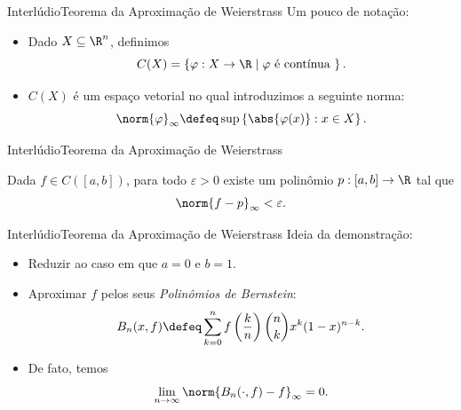 \documentclass[13pt]{beamer}
\begin{document}
\begin{frame}{Interlúdio}{Teorema da Aproximação de Weierstrass}
    Um pouco de notação:
    \begin{itemize}
        \item Dado \( X \subseteq \R^{ n } \), definimos
            \begin{equation*}
                C ( X ) = \left\{ \varphi : X \to \R \mid \varphi \text{ é contínua } \right\}
            .\end{equation*}
        \item \( C ( X ) \) é um espaço vetorial no qual introduzimos a seguinte norma:
            \begin{equation*}
                \norm{ \varphi }_{ \infty } \defeq \sup \left\{ \abs{ \varphi ( x ) } : x \in X \right\}
            .\end{equation*}
    \end{itemize}
\end{frame}

\begin{frame}{Interlúdio}{Teorema da Aproximação de Weierstrass}
    \begin{teo*}
        Dada \( f \in C ( [a, b] ) \), para todo \( \varepsilon > 0 \) existe um polinômio \( p : [a, b] \to \R \) tal que
        \begin{equation*}
            \norm{ f - p }_{ \infty } < \varepsilon
        .\end{equation*}
    \end{teo*}
\end{frame}

\begin{frame}{Interlúdio}{Teorema da Aproximação de Weierstrass}
    Ideia da demonstração:
    \begin{itemize}
        \item<1-> Reduzir ao caso em que \( a = 0 \) e \( b = 1 \).
        \item<2-> Aproximar \( f \) pelos seus \emph{Polinômios de Bernstein}:
            \begin{equation*}
                B_{ n } ( x, f ) \defeq \sum_{ k=0 }^{ n } f
                \left( \frac{ k }{ n } \right)
                \binom{n}{k}
                x^{ k }
                ( 1 - x )^{ n - k }
            .\end{equation*}
        \item<3-> De fato, temos
            \begin{equation*}
                \lim_{ n \to \infty } \norm{ B_{ n } ( \cdot, f ) - f }_{ \infty } = 0
            .\end{equation*}
    \end{itemize}
\end{frame}
\end{document}

